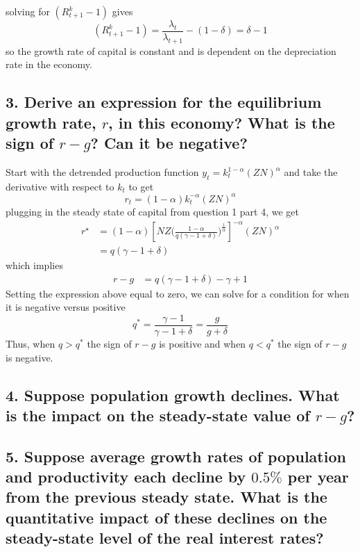 \documentclass[10pt,letter]{article}
\begin{document}
solving for $(R^k_{t+1}-1)$ gives 
\begin{equation*}
	(R^k_{t+1}-1) = \frac{\lambda_t}{\lambda_{t+1}} - (1-\delta) = \delta - 1
\end{equation*}
so the growth rate of capital is constant and is dependent on the depreciation rate in the economy. 
\subsection*{3. Derive an expression for the equilibrium growth rate, $r$, in this economy? What is the sign of $r-g$? Can it be negative?}
Start with the detrended production function $y_t = k_t^{1-\alpha}(ZN)^\alpha$ and take the derivative with respect to $k_t$ to get 
\begin{equation*}
	r_t = (1-\alpha)k_t^{-\alpha}(ZN)^{\alpha}
\end{equation*}
plugging in the steady state of capital from question 1 part 4, we get 
\begin{equation*}
\begin{split}
	r^\star &= (1-\alpha)\left[NZ\bigg(\frac{1-\alpha}{q(\gamma-1+\delta)}\bigg)^{\frac{1}{\alpha}}\right]^{-\alpha}(ZN)^\alpha\\
	&= q(\gamma-1+\delta)
\end{split}
\end{equation*}
which implies 
\begin{equation*}
	\begin{split}
	r - g &= q(\gamma - 1 + \delta)-\gamma +1
	\end{split}
\end{equation*}
Setting the expression above equal to zero, we can solve for a condition for when it is negative versus positive
\begin{equation*}
	q^* = \frac{\gamma-1}{\gamma-1+\delta} = \frac{g}{g+\delta}
\end{equation*}
Thus, when $q>q^*$ the sign of $r-g$ is positive and when $q<q^*$ the sign of $r-g$ is negative. 
\subsection*{4. Suppose population growth declines. What is the impact on the steady-state value of $r-g$? }
\subsection*{5. Suppose average growth rates of population and productivity each decline by $0.5\%$ per year from the previous steady state. What is the quantitative impact of these declines on the steady-state level of the real interest rates? }
\end{document}
